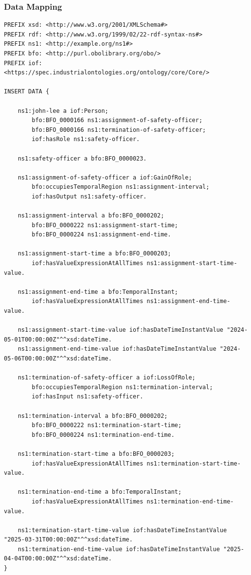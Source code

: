 \subsubsection*{Data Mapping}

\begin{verbatim}
PREFIX xsd: <http://www.w3.org/2001/XMLSchema#>
PREFIX rdf: <http://www.w3.org/1999/02/22-rdf-syntax-ns#>
PREFIX ns1: <http://example.org/ns1#>
PREFIX bfo: <http://purl.obolibrary.org/obo/> 
PREFIX iof: <https://spec.industrialontologies.org/ontology/core/Core/>

INSERT DATA {
    
    ns1:john-lee a iof:Person;
    	bfo:BFO_0000166 ns1:assignment-of-safety-officer;
    	bfo:BFO_0000166 ns1:termination-of-safety-officer;
    	iof:hasRole ns1:safety-officer.
    
    ns1:safety-officer a bfo:BFO_0000023.

    ns1:assignment-of-safety-officer a iof:GainOfRole;
        bfo:occupiesTemporalRegion ns1:assignment-interval;
    	iof:hasOutput ns1:safety-officer.

    ns1:assignment-interval a bfo:BFO_0000202;
        bfo:BFO_0000222 ns1:assignment-start-time;
        bfo:BFO_0000224 ns1:assignment-end-time.
    
    ns1:assignment-start-time a bfo:BFO_0000203;
        iof:hasValueExpressionAtAllTimes ns1:assignment-start-time-value.

    ns1:assignment-end-time a bfo:TemporalInstant;
        iof:hasValueExpressionAtAllTimes ns1:assignment-end-time-value. 

    ns1:assignment-start-time-value iof:hasDateTimeInstantValue "2024-05-01T00:00:00Z"^^xsd:dateTime.
    ns1:assignment-end-time-value iof:hasDateTimeInstantValue "2024-05-06T00:00:00Z"^^xsd:dateTime.

    ns1:termination-of-safety-officer a iof:LossOfRole;  
        bfo:occupiesTemporalRegion ns1:termination-interval;
    	iof:hasInput ns1:safety-officer.

    ns1:termination-interval a bfo:BFO_0000202;
        bfo:BFO_0000222 ns1:termination-start-time;
        bfo:BFO_0000224 ns1:termination-end-time.
    
    ns1:termination-start-time a bfo:BFO_0000203;
        iof:hasValueExpressionAtAllTimes ns1:termination-start-time-value.

    ns1:termination-end-time a bfo:TemporalInstant;
        iof:hasValueExpressionAtAllTimes ns1:termination-end-time-value. 

    ns1:termination-start-time-value iof:hasDateTimeInstantValue "2025-03-31T00:00:00Z"^^xsd:dateTime.
    ns1:termination-end-time-value iof:hasDateTimeInstantValue "2025-04-04T00:00:00Z"^^xsd:dateTime.
}

\end{verbatim}

